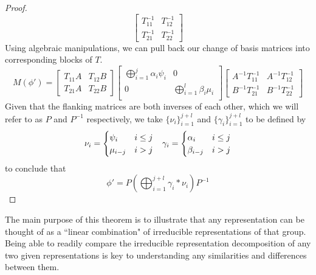 \begin{proof}
\begin{equation}
\begin{bmatrix}
					T_{11}^{-1} & T_{12}^{-1} \\
					T_{21}^{-1} & T_{22}^{-1}
				\end{bmatrix}
\end{equation}
Using algebraic manipulations, we can pull back our change of basis matrices into corresponding blocks of $T$.
\begin{equation}
	M(\phi') =  \begin{bmatrix}
					T_{11}A & T_{12}B \\
					T_{21}A & T_{22}B
				\end{bmatrix}
				\begin{bmatrix}
					\bigoplus_{i=1}^j \alpha_i\psi_i & 0\\
					0 &  \bigoplus_{i=1}^{l} \beta_i\mu_i \\
				\end{bmatrix}
				\begin{bmatrix}
					A^{-1}T_{11}^{-1} & A^{-1}T_{12}^{-1} \\
					B^{-1}T_{21}^{-1} & B^{-1}T_{22}^{-1}
				\end{bmatrix}
\end{equation}
Given that the flanking matrices are both inverses of each other, which we will refer to as $P$ and $P^{-1}$ respectively, we take $\{\nu_i\}_{i=1}^{j+l}$ and  $\{\gamma_i\}_{i=1}^{j+l}$ to be defined by 
$$\begin{array}{c c}
	\nu_i = \begin{cases}
		\psi_i & i \leq j\\
		\mu_{i-j} & i > j
	\end{cases}
&
	\gamma_i = \begin{cases}
		\alpha_i & i \leq j\\
		\beta_{i-j} & i > j
	\end{cases}
\end{array}$$
to conclude that
\begin{equation}
	\phi' = P\left(\bigoplus_{i=1}^{j+l} \gamma_i*\nu_i\right)P^{-1}
\end{equation} \end{proof}

\begin{remark}
	The main purpose of this theorem is to illustrate that any representation can be thought of as a ``linear combination" of irreducible representations of that group. Being able to readily compare the irreducible representation decomposition of any two given representations is key to understanding any similarities and differences between them.
\end{remark}


